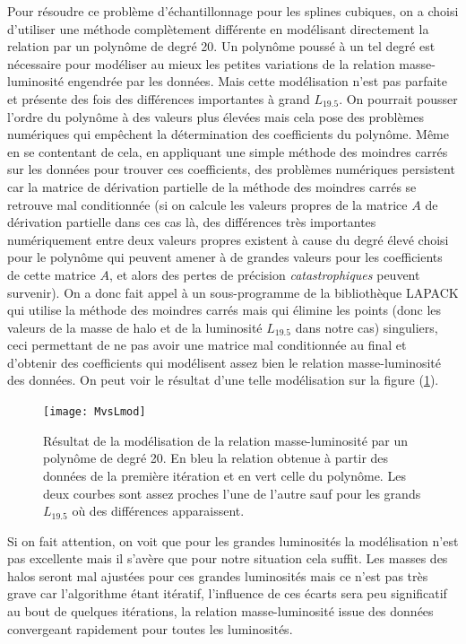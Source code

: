 Pour résoudre ce problème d'échantillonnage pour les splines cubiques, on a choisi d'utiliser une méthode complètement différente
en modélisant directement la relation par un polynôme de degré \num{20}. Un polynôme poussé à un tel degré est nécessaire pour
modéliser au mieux les petites variations de la relation masse-luminosité engendrée par les données. Mais cette modélisation n'est
pas parfaite et présente des fois des différences importantes à grand $L_{19.5}$. On pourrait pousser l'ordre du polynôme à des
valeurs plus élevées mais cela pose des problèmes numériques qui empêchent la détermination des coefficients du polynôme. Même en
se contentant de cela, en appliquant une simple méthode des moindres carrés sur les données pour trouver ces coefficients, des
problèmes numériques persistent car la matrice de dérivation partielle de la méthode des moindres carrés se retrouve mal
conditionnée (si on calcule les valeurs propres de la matrice $A$ de dérivation partielle dans ces cas là, des différences très
importantes numériquement entre deux valeurs propres existent à cause du degré élevé choisi pour le polynôme qui peuvent amener à
de grandes valeurs pour les coefficients de cette matrice $A$, et alors des pertes de précision \emph{catastrophiques} peuvent
survenir). On a donc fait appel à un sous-programme de la bibliothèque LAPACK qui utilise la méthode des moindres carrés mais qui
élimine les points (donc les valeurs de la masse de halo et de la luminosité $L_{19.5}$ dans notre cas) singuliers, ceci permettant
de ne pas avoir une matrice mal conditionnée au final et d'obtenir des coefficients qui modélisent assez bien le relation
masse-luminosité des données. On peut voir le résultat d'une telle modélisation sur la figure (\ref{fig:mvslmod}).
\begin{figure}[htb]
	\centering
	\texttt{[image: MvsLmod]}
	\caption{\footnotesize{}Résultat de la modélisation de la relation masse-luminosité par un polynôme de degré \num{20}. En
	bleu la relation obtenue à partir des données de la première itération et en vert celle du polynôme. Les deux courbes sont
	assez proches l'une de l'autre sauf pour les grands $L_{19.5}$ où des différences apparaissent.}
	\label{fig:mvslmod}
\end{figure}
Si on fait attention, on voit que pour les grandes luminosités la modélisation n'est pas excellente mais il s'avère que pour notre
situation cela suffit. Les masses des halos seront mal ajustées pour ces grandes luminosités mais ce n'est pas très grave car
l'algorithme étant itératif, l'influence de ces écarts sera peu significatif au bout de quelques itérations, la relation
masse-luminosité issue des données convergeant rapidement pour toutes les luminosités.


